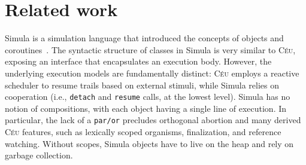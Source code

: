 \documentclass{sigplanconf}
\newcommand{\CEU}{\textsc{C\'{e}u}\xspace}
\newcommand{\code}[1] {{\small{\texttt{#1}}}}
\newcommand{\1}{\;}
\newcommand{\2}{\;\;}
\newcommand{\3}{\;\;\;}
\newcommand{\5}{\;\;\;\;\;}
\begin{document}
\section{Related work}
\label{sec.related}

Simula is a simulation language that introduced the concepts of objects and 
coroutines~\cite{simula}.
%
The syntactic structure of classes in Simula is very similar to \CEU, exposing 
an interface that encapsulates an execution body.
%
However, the underlying execution models are fundamentally distinct:
\CEU employs a reactive scheduler to resume trails based on external stimuli, 
while Simula relies on cooperation (i.e., \code{detach} and \code{resume} 
calls, at the lowest level).
%
Simula has no notion of compositions, with each object having a single line of 
execution.
In particular, the lack of a \code{par/or} precludes orthogonal abortion and 
many derived \CEU features, such as lexically scoped organisms, finalization, 
and reference watching.
%
Without scopes, Simula objects have to live on the heap and rely on garbage 
collection.
%
\end{document}
